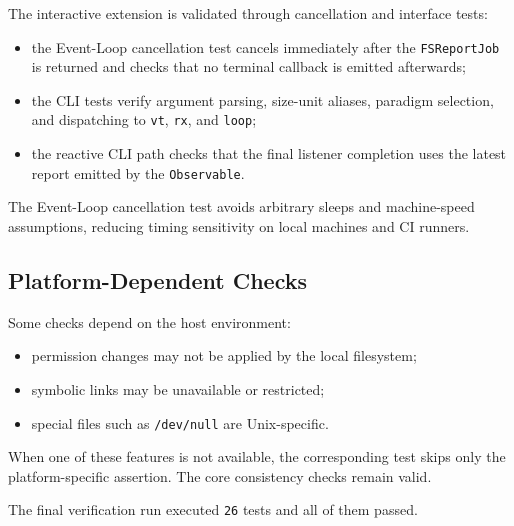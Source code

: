 The interactive extension is validated through cancellation and interface
tests:

\begin{itemize}
  \item the Event-Loop cancellation test cancels immediately after the
  \texttt{FSReportJob} is returned and checks that no terminal callback is
  emitted afterwards;
  \item the CLI tests verify argument parsing, size-unit aliases, paradigm
  selection, and dispatching to \texttt{vt}, \texttt{rx}, and \texttt{loop};
  \item the reactive CLI path checks that the final listener completion uses
  the latest report emitted by the \texttt{Observable}.
\end{itemize}

The Event-Loop cancellation test avoids arbitrary sleeps and machine-speed
assumptions, reducing timing sensitivity on local machines and CI runners.

\subsection{Platform-Dependent Checks}

Some checks depend on the host environment:

\begin{itemize}
  \item permission changes may not be applied by the local filesystem;
  \item symbolic links may be unavailable or restricted;
  \item special files such as \texttt{/dev/null} are Unix-specific.
\end{itemize}

When one of these features is not available, the corresponding test skips only
the platform-specific assertion. The core consistency checks remain valid.

The final verification run executed \texttt{26} tests and all of them passed.
